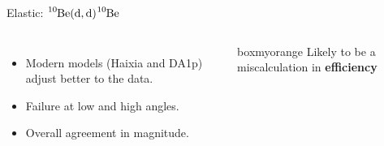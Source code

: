 \documentclass[sans,
frameno, %
mp,
usenames,dvipsnames, %
onlytextwidth, %
t,%
11pt]{beamer}
\newcommand{\iso}[2]{\ce{^{#1}#2}}
\begin{document}
\begin{frame}{Elastic: $\iso{10}{Be}(\textrm{d}, \textrm{d})\iso{10}{Be}$}
{\begin{figure}
\begin{minipage}[t]{0.48\linewidth}
            \end{minipage}
        \end{figure}
        \begin{columns}
            {
                \begin{itemize}
                    \item Modern models (Haixia and DA1p) adjust better to the data.
                    \item Failure at low and high angles.
                    \item Overall agreement in magnitude.
                \end{itemize}
            }\hfill
            {

                \begin{beamercolorbox}[sep=1ex, center, rounded=true]{boxmyorange}
                    Likely to be a miscalculation in \textbf{efficiency}
                \end{beamercolorbox}

}
\end{columns}}
\end{frame}
\end{document}
